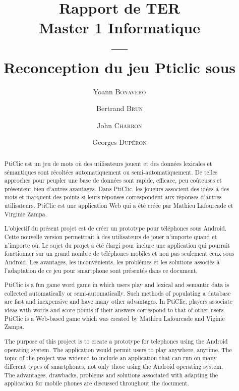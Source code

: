 \documentclass[a4paper,11pt,french]{article}
\title{Rapport de TER
\\Master 1 Informatique
\\---\\
Reconception du jeu Pticlic sous \android{}}
\author{Yoann \textsc{Bonavero} \and Bertrand \textsc{Brun} \and John \textsc{Charron} \and Georges \textsc{Dupéron}}
\begin{document}
\maketitle

\pagestyle{empty}
\thispagestyle{empty}

\tableofcontents


\pagestyle{empty}
\thispagestyle{empty}
\newpage
{}
\setcounter{page}{1}
\pagestyle{plain}

\begin{abstract}
  PtiClic est un jeu de mots où des utilisateurs jouent et des données lexicales et sémantiques sont récoltées automatiquement ou
  semi-automatiquement. De telles approches pour peupler une base de données sont rapide, efficace, peu coûteuses et présentent bien
  d'autres avantages. Dans PtiClic, les joueurs associent des idées à des mots et marquent des points si leurs réponses correspondent aux
  réponses d'autres utilisateurs. PtiClic est une application Web qui a été créée par Mathieu Lafourcade et Virginie Zampa.

  L'objectif du présent projet est de créer un prototype pour téléphones sous Android. Cette nouvelle version permettrait à des utilisateurs
  de jouer n'importe quand et n'importe où. Le sujet du projet a été élargi pour inclure une application qui pourrait fonctionner sur un
  grand nombre de téléphones mobiles et non pas seulement ceux sous Android. Les avantages, les inconvénients, les problèmes et les
  solutions associés à l'adaptation de ce jeu pour smartphone sont présentés dans ce document.
\end{abstract}

\begin{abstract}
  PtiClic is a fun game word game in which users play and lexical and semantic data is collected automatically or semi-automatically. Such
  methods of populating a database are fast and inexpensive and have many other advantages. In PtiClic, players associate ideas with words
  and score points if their answers correspond to that of other users. PtiClic is a Web-based game which was created by Mathieu Lafourcade
  and Viginie Zampa.

  The purpose of this project is to create a prototype for telephones using the Android operating system. The application would permit users
  to play anywhere, anytime. The topic of the project was widened to include an application that can run on many different types of
  smartphones, not only those using the Android operating system. The advantages, drawbacks, problems and solutions associated with adapting
  the application for mobile phones are discussed throughout the document.
\end{abstract}
\pagebreak
\end{document}
